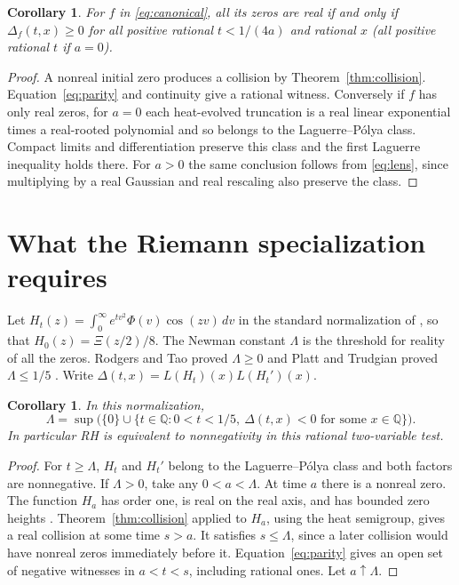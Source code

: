 \documentclass[11pt,a4paper]{article}
\newtheorem{corollary}[theorem]{Corollary}
\numberwithin{equation}{section}
\begin{document}
\begin{corollary}\label{cor:weak}
For $f$ in \eqref{eq:canonical}, all its zeros are real if and only if
$\Delta_f(t,x)\ge0$ for all positive rational $t<1/(4a)$ and rational
$x$ (all positive rational $t$ if $a=0$).
\end{corollary}
\begin{proof}
A nonreal initial zero produces a collision by
Theorem~\ref{thm:collision}. Equation~\eqref{eq:parity} and continuity
give a rational witness. Conversely if $f$ has only real zeros, for
$a=0$ each heat-evolved truncation is a real linear exponential times
a real-rooted polynomial and so belongs to the Laguerre--P\'olya
class. Compact limits and differentiation preserve this class and
the first Laguerre inequality holds there. For $a>0$ the same conclusion
follows from \eqref{eq:lens}, since multiplying by a real Gaussian
and real rescaling also preserve the class.
\end{proof}

\section{What the Riemann specialization requires}
Let $H_t(z)=\int_0^\infty e^{t v^2}\Phi(v)\cos(zv)\,dv$ in the
standard normalization of \cite{RT,Poly}, so that
$H_0(z)=\Xi(z/2)/8$. The Newman constant $\Lambda$ is the threshold
for reality of all the zeros. Rodgers and Tao proved $\Lambda\ge0$
and Platt and Trudgian proved $\Lambda\le1/5$
\cite{RT,PT}. Write $\Delta(t,x)=L(H_t)(x)L(H_t')(x)$.
\begin{corollary}\label{cor:RH}
In this normalization,
\[
 \Lambda=\sup\bigl(\{0\}\cup
 \{t\in\mathbb Q:0<t<1/5,\ \Delta(t,x)<0
                        \text{ for some }x\in\mathbb Q\}\bigr).
\]
In particular RH is equivalent to nonnegativity in this rational
two-variable test.
\end{corollary}
\begin{proof}
For $t\ge\Lambda$, $H_t$ and $H_t'$ belong to the Laguerre--P\'olya
class and both factors are nonnegative. If $\Lambda>0$, take any
$0<a<\Lambda$. At time $a$ there is a nonreal zero. The function
$H_a$ has order one, is real on the real axis, and has bounded zero heights
\cite{Poly}. Theorem~\ref{thm:collision} applied to $H_a$, using
the heat semigroup, gives a real collision at some time $s>a$.
It satisfies $s\le\Lambda$, since a later collision would have
nonreal zeros immediately before it. Equation~\eqref{eq:parity}
gives an open set of negative witnesses in $a<t<s$, including
rational ones. Let $a\uparrow\Lambda$.
\end{proof}
\end{document}
